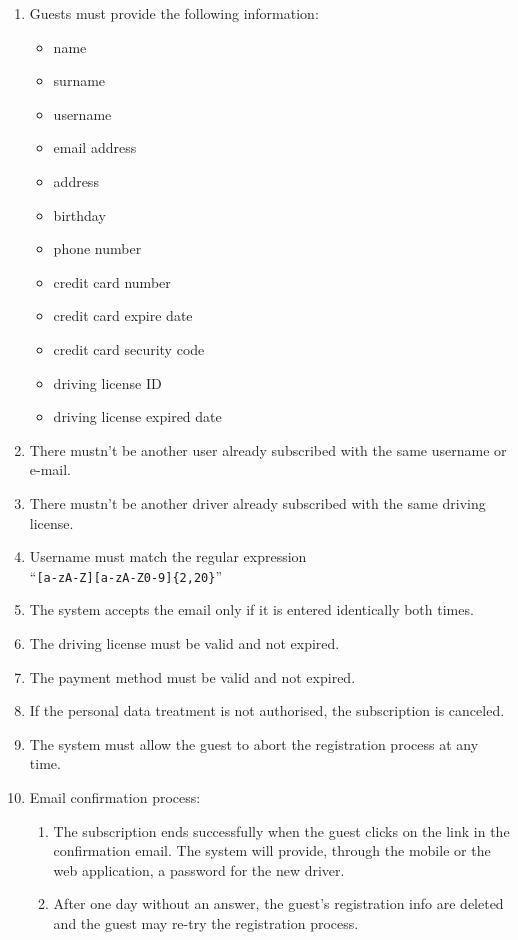\begin{enumerate}
	\item Guests must provide the following information:
	\begin{itemize}
		\item name
		\item surname
		\item username
		\item email address
		\item address
		\item birthday
		\item phone number
		\item credit card number
		\item credit card expire date
		\item credit card security code
		\item driving license ID
		\item driving license expired date	
	\end{itemize}
	\item There mustn't be another user already subscribed with the same username or e-mail. \label{f-sameinfo}
	\item There mustn't be another driver already subscribed with the same driving license. \label{f-samelicense}	
	\item Username must match the regular expression\\``\texttt{[a-zA-Z][a-zA-Z0-9]\{2,20\}}''    \label{f-usrn}
	\item The system accepts the email only if it is entered identically both times.\label{f-wrongmail}
	\item The driving license must be valid and not expired.
	\label{f-licenseexp}
	\item The payment method must be valid and not expired.
	\label{f-cc}
	\item If the personal data treatment is not authorised, the subscription is canceled. \label{f-dataTreat}
	\item The system must allow the guest to abort the registration process at any time.
	\item Email confirmation process:
	\begin{enumerate}
		\item The subscription ends successfully when the guest clicks on the link in the confirmation email. The system will provide, through the mobile or the web application, a password for the new driver.
		\item After one day without an answer, the guest's registration info are deleted and the guest may re-try the registration process.  \label{f-confirm}
	\end{enumerate}
\end{enumerate}

